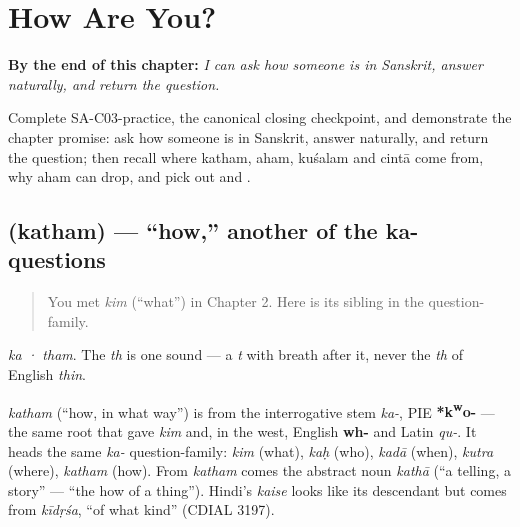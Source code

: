 
\chapter{How Are You?}
\label{ch:responding}

\begin{chapteropening}
\textbf{By the end of this chapter:} \emph{I can ask how someone is in Sanskrit, answer naturally, and return the question.}

Complete SA-C03-practice, the canonical closing checkpoint, and demonstrate the chapter promise: ask how someone is in Sanskrit, answer naturally, and return the question; then recall where katham, aham, kuśalam and cintā come from, why aham can drop, and pick out  and .
\end{chapteropening}

\section[\texorpdfstring{\sk{कथम्} (katham)}{कथम् (katham)}]{ (katham) — \textquotedblleft{}how,\textquotedblright{} another of the ka- questions}

\label{lesson:SA-C03-katham}



\begin{quote}
You met \emph{kim} (\textquotedblleft{}what\textquotedblright{}) in Chapter 2. Here is its sibling in the question-family.
\end{quote}

\begin{sounds}
\emph{ka · tham}. The \emph{th} is one sound — a \emph{t} with breath after it, never the \emph{th} of English \emph{thin}.
\end{sounds}

\begin{cousinweb}
\emph{katham} (\textquotedblleft{}how, in what way\textquotedblright{}) is from the interrogative stem \emph{ka-}, PIE \textbf{*k\textsuperscript{w}o-} — the same root that gave \emph{kim} and, in the west, English \textbf{wh-} and Latin \emph{qu-}. It heads the same \emph{ka-} question-family: \emph{kim} (what), \emph{kaḥ} (who), \emph{kadā} (when), \emph{kutra} (where), \emph{katham} (how). From \emph{katham} comes the abstract noun \emph{kathā} (\textquotedblleft{}a telling, a story\textquotedblright{} — \textquotedblleft{}the how of a thing\textquotedblright{}). Hindi's \emph{kaise} looks like its descendant but comes from \emph{kīdṛśa}, \textquotedblleft{}of what kind\textquotedblright{} (CDIAL 3197).
\end{cousinweb}

